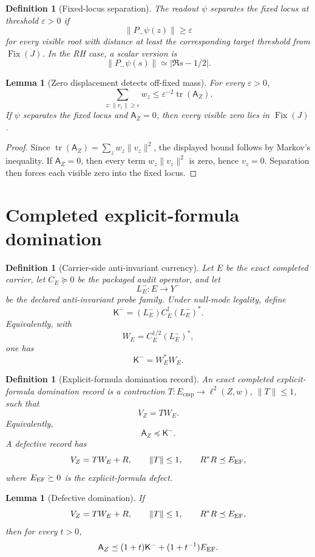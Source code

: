 \documentclass[11pt]{article}
\newtheorem{lemma}[theorem]{Lemma}
\newtheorem{definition}[theorem]{Definition}
\newcommand{\K}{\mathsf K}
\newcommand{\A}{\mathsf A}
\newcommand{\Fix}{\operatorname{Fix}}
\newcommand{\tr}{\operatorname{tr}}
\begin{document}
\begin{definition}[Fixed-locus separation]
The readout \(\psi\) separates the fixed locus at threshold \(\varepsilon>0\) if
\[
  \|P_-\psi(z)\|\ge \varepsilon
\]
for every visible root with distance at least the corresponding target threshold from \(\Fix(J)\).  In the RH case, a scalar version is
\[
  \|P_-\psi(s)\|\simeq |\Re s-1/2|.
\]
\end{definition}

\begin{lemma}[Zero displacement detects off-fixed mass]
For every \(\varepsilon>0\),
\[
  \sum_{z:\|v_z\|\ge \varepsilon} w_z
  \le
  \varepsilon^{-2}\tr(\A_Z).
\]
If \(\psi\) separates the fixed locus and \(\A_Z=0\), then every visible zero lies in \(\Fix(J)\).
\end{lemma}

\begin{proof}
Since \(\tr(\A_Z)=\sum_z w_z\|v_z\|^2\), the displayed bound follows by Markov's inequality.  If \(\A_Z=0\), then every term \(w_z\|v_z\|^2\) is zero, hence \(v_z=0\).  Separation then forces each visible zero into the fixed locus.
\end{proof}

\section{Completed explicit-formula domination}

\begin{definition}[Carrier-side anti-invariant currency]
Let \(E\) be the exact completed carrier, let \(C_E\succeq0\) be the packaged audit operator, and let
\[
  L_E^-:E\to Y^-
\]
be the declared anti-invariant probe family.  Under null-mode legality, define
\[
  \K^-=(L_E^-)C_E^\dagger(L_E^-)^*.
\]
Equivalently, with
\[
  W_E=C_E^{\dagger/2}(L_E^-)^*,
\]
one has
\[
  \K^-=W_E^*W_E.
\]
\end{definition}

\begin{definition}[Explicit-formula domination record]
An exact completed explicit-formula domination record is a contraction \(T:E_\mathrm{cmp}\to \ell^2(Z,w)\), \(\|T\|\le1\), such that
\[
  V_Z=T W_E.
\]
Equivalently,
\[
  \A_Z\preceq \K^-.
\]
A defective record has
\[
  V_Z=TW_E+R,
  \qquad \|T\|\le1,
  \qquad R^*R\preceq E_{\rm EF},
\]
where \(E_{\rm EF}\succeq0\) is the explicit-formula defect.
\end{definition}

\begin{lemma}[Defective domination]
If
\[
  V_Z=TW_E+R,
  \qquad \|T\|\le1,
  \qquad R^*R\preceq E_{\rm EF},
\]
then for every \(t>0\),
\[
  \A_Z\preceq (1+t)\K^-+(1+t^{-1})E_{\rm EF}.
\]
\end{lemma}
\end{document}
